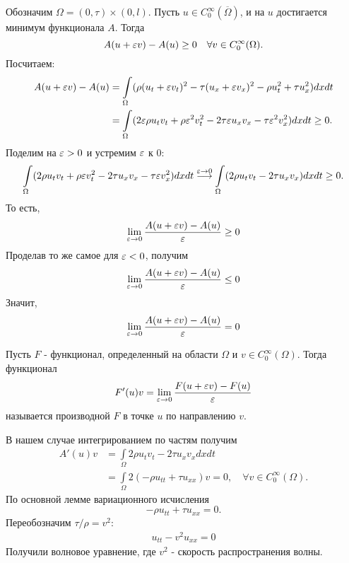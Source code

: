 Обозначим $\Omega = (0, \tau) \times (0, l)$.
Пусть $u \in C^{\infty}_0(\overline{\Omega})$, и на $u$ достигается минимум функционала $A$. Тогда 
$$A(u + \varepsilon v) - A(u) \geq 0\quad \forall v \in C^{\infty}_0(\Omega).$$
Посчитаем:
\begin{align*}
A(u + \varepsilon v) - A(u) & =  \int \limits_{\Omega} (\rho(u_t + \varepsilon v_t)^2 - \tau(u_x + \varepsilon v_x)^2 - \rho u_t^2 + \tau u_x^2 ) dxdt \\
 & = \int \limits_{\Omega} (2 \varepsilon \rho u_t v_t + \rho \varepsilon^2 v_t^2 - 2 \tau \varepsilon u_x v_x - \tau \varepsilon^2 v_x^2 ) dxdt \geq 0 .
\end{align*}
Поделим на $\varepsilon > 0$ и устремим $\varepsilon$ к $0$:
$$ \int \limits_{\Omega} (2 \rho u_t v_t + \rho \varepsilon v_t^2 - 2 \tau u_x v_x - \tau \varepsilon v_x^2 ) dxdt \stackrel{\varepsilon \to 0} \longrightarrow \int \limits_{\Omega} (2 \rho u_t v_t - 2 \tau u_x v_x) dxdt \geq 0 .$$
То есть,
$$ \lim \limits_{\varepsilon \to 0} \frac {A(u + \varepsilon v) - A(u)} {\varepsilon} \geq 0$$
Проделав то же самое для $\varepsilon < 0$, получим
$$ \lim \limits_{\varepsilon \to 0} \frac {A(u + \varepsilon v) - A(u)} {\varepsilon} \leq 0$$
Значит, $$ \lim \limits_{\varepsilon \to 0} \frac {A(u + \varepsilon v) - A(u)} {\varepsilon} = 0$$

\begin{definition} Пусть $F$ - функционал, определенный на области $\Omega$ и $v \in C^{\infty}_0(\Omega)$. Тогда функционал 
$$ F'(u)v = \lim \limits_{\varepsilon \to 0} \frac {F(u + \varepsilon v) - F(u)} {\varepsilon}$$
называется производной $F$ в точке $u$ по направлению $v$.
\end{definition}

В нашем случае интегрированием по частям получим
\begin{align*}
A'(u)v &  = \int \limits_{\Omega} 2 \rho u_t v_t - 2 \tau u_x v_x dx dt \\
       &  = \int \limits_{\Omega} 2 (-\rho u_{tt} + \tau u_{xx}) v = 0,\quad \forall v \in C^{\infty}_0 (\Omega).
\end{align*}
По основной лемме вариационного исчисления 
$$ -\rho u_{tt} + \tau u_{xx} = 0 .$$
Переобозначим $\tau / \rho = v^2 $:
\begin{align}
    u_{tt} - v^2 u_{xx} = 0
\label{waveequation}
\end{align}
Получили волновое уравнение, где $v^2$ - скорость распространения волны.
